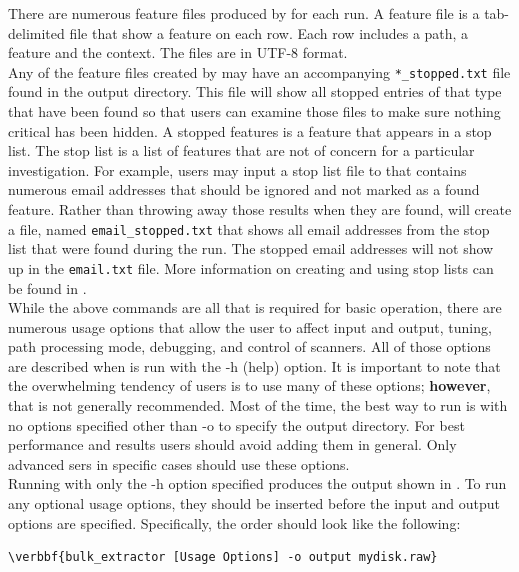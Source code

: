 \documentclass[11pt]{article} %
\begin{document}
There are numerous feature files produced by \bulk for each run. A feature file is a tab-delimited file that show a feature on each row. Each row includes a path, a feature and the context. The files are in UTF-8 format.\\

Any of the feature files created by \bulk may have an accompanying \texttt{*\_stopped.txt} file found in the output directory. This file will show all stopped entries of that type that have been found so that users can examine those files to make sure nothing critical has been hidden. A stopped features is a feature that appears in a stop list. The stop list is a list of features that are not of concern for a particular investigation. For example, users may input a stop list file to \bulk that contains numerous email addresses that should be ignored and not marked as a found feature. Rather than throwing away those results when they are found, \bulk will create a file, named \texttt{email\_stopped.txt} that shows all email addresses from the stop list that were found during the run. The stopped email addresses will not show up in the \texttt{email.txt} file. More information on creating and using stop lists can be found in \textbf{}.\\

While the above commands are all that is required for basic operation, there are numerous usage options that allow the user to affect input and output, tuning, path processing mode, debugging, and control of scanners. All of those options are described when \bulk is run with the -h (help) option. It is important to note that the overwhelming tendency of users is to use many of these options; \textbf{however}, that is not generally recommended. Most of the time, the best way to run \bulk is with no options specified other than -o to specify the output directory. For best performance and results users should avoid adding them in general. Only advanced sers in specific cases should use these options.\\

Running \bulk with only the -h option specified produces the output shown in \textbf{}.  To run any optional usage options, they should be inserted before the input and output options are specified. Specifically, the order should look like the following:

\begin{Verbatim}[commandchars=\\\{\}]
\verbbf{bulk_extractor [Usage Options] -o output mydisk.raw}
\end{Verbatim}
\end{document}
